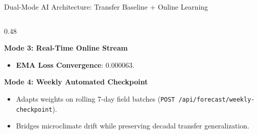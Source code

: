 \documentclass[aspectratio=169,10pt]{beamer}
\begin{document}
\begin{frame}{Dual-Mode AI Architecture: Transfer Baseline + Online Learning}
\begin{columns}[T]
\begin{column}{0.48\textwidth}
\begin{exampleblock}{\textbf{Mode 3: Real-Time Online Stream}}
\begin{itemize}
                    \item \textbf{EMA Loss Convergence}: $0.000063$.
                \end{itemize}
            \end{exampleblock}
            \vspace{0.2cm}
            \begin{exampleblock}{\textbf{Mode 4: Weekly Automated Checkpoint}}
                \footnotesize
                \begin{itemize}
                    \item Adapts weights on rolling 7-day field batches (\texttt{POST /api/forecast/weekly-checkpoint}).
                    \item Bridges microclimate drift while preserving decadal transfer generalization.
                \end{itemize}
            \end{exampleblock}
        \end{column}
    \end{columns}
\end{frame}
\end{document}
